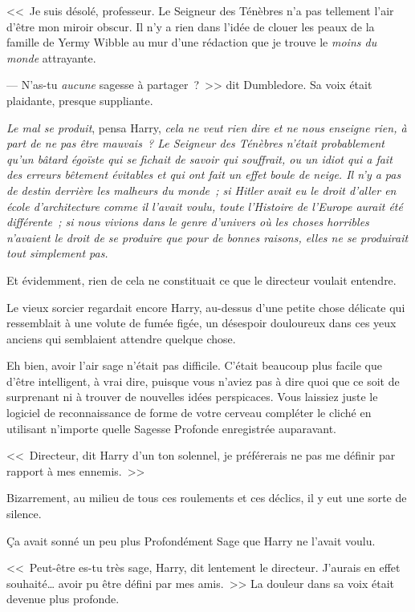 <<~Je suis désolé, professeur. Le Seigneur des Ténèbres n'a pas tellement l'air d'être mon miroir obscur. Il n'y a rien dans l'idée de clouer les peaux de la famille de Yermy Wibble au mur d'une rédaction que je trouve le \emph{moins du monde} attrayante.

--- N'as-tu \emph{aucune} sagesse à partager~?~>> dit Dumbledore. Sa voix était plaidante, presque suppliante.

\emph{Le mal se produit}, pensa Harry, \emph{cela ne veut rien dire et ne nous enseigne rien, à part de ne pas être mauvais~? Le Seigneur des Ténèbres n'était probablement qu'un bâtard égoïste qui se fichait de savoir qui souffrait, ou un idiot qui a fait des erreurs bêtement évitables et qui ont fait un effet boule de neige. Il n'y a pas de destin derrière les malheurs du monde~; si Hitler avait eu le droit d'aller en école d'architecture comme il l'avait voulu, toute l'Histoire de l'Europe aurait été différente~; si nous vivions dans le genre d'univers où les choses horribles n'avaient le droit de se produire que pour de bonnes raisons, elles ne se produirait tout simplement pas.}

Et évidemment, rien de cela ne constituait ce que le directeur voulait entendre.

Le vieux sorcier regardait encore Harry, au-dessus d'une petite chose délicate qui ressemblait à une volute de fumée figée, un désespoir douloureux dans ces yeux anciens qui semblaient attendre quelque chose.

Eh bien, avoir l'air sage n'était pas difficile. C'était beaucoup plus facile que d'être intelligent, à vrai dire, puisque vous n'aviez pas à dire quoi que ce soit de surprenant ni à trouver de nouvelles idées perspicaces. Vous laissiez juste le logiciel de reconnaissance de forme de votre cerveau compléter le cliché en utilisant n'importe quelle Sagesse Profonde enregistrée auparavant.

<<~Directeur, dit Harry d'un ton solennel, je préférerais ne pas me définir par rapport à mes ennemis.~>>

Bizarrement, au milieu de tous ces roulements et ces déclics, il y eut une sorte de silence.

Ça avait sonné un peu plus Profondément Sage que Harry ne l'avait voulu.

<<~Peut-être es-tu très sage, Harry, dit lentement le directeur. J'aurais en effet souhaité… avoir pu être défini par mes amis.~>> La douleur dans sa voix était devenue plus profonde.

